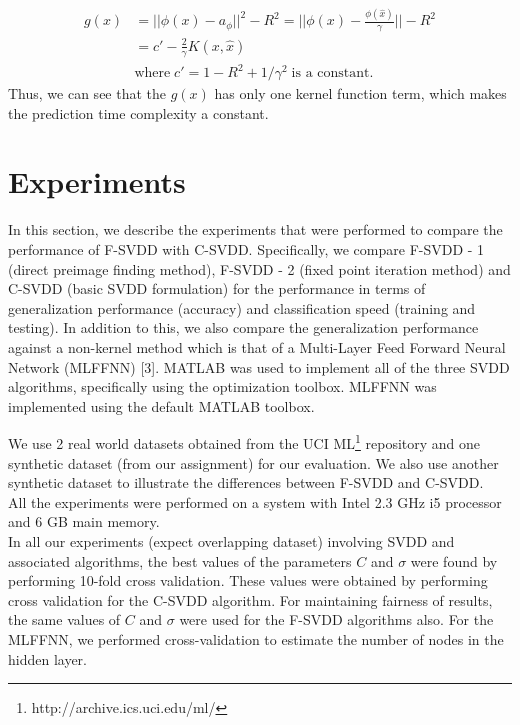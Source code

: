 \documentclass{article} %
\begin{document}
\begin{equation} \label{disc}
\begin{split}
g(x) &= || \phi(x) - a_\phi||^2 - R^2 = ||\phi(x) - \frac{\phi(\hat{x})}{\gamma} || - R^2 \\
 &=   c' - \frac{2}{\gamma} K(x,\hat{x}) \\ 
 & \text{where}\;  c' = 1- R^2 + 1/\gamma^2 \; \text{is a constant}.
\end{split}
\end{equation}
Thus, we can see that the $g(x)$ has only one kernel function term, which makes the prediction time complexity a constant. 

\section{Experiments}
In this section, we describe the experiments that were performed to compare the performance of F-SVDD with C-SVDD. Specifically, we compare F-SVDD - 1 (direct preimage finding method), F-SVDD - 2 (fixed point iteration method) and C-SVDD (basic SVDD formulation) for the performance in terms of generalization performance (accuracy) and classification speed (training and testing). In addition to this, we also compare the generalization performance against a non-kernel method which is that of a Multi-Layer Feed Forward Neural Network (MLFFNN) [3]. MATLAB was used to implement all of the three SVDD algorithms, specifically using the optimization toolbox. MLFFNN was implemented using the default MATLAB toolbox. 

We use 2 real world datasets obtained from the UCI ML\footnote{http://archive.ics.uci.edu/ml/} repository and one synthetic dataset (from our assignment) for our evaluation. We also use another synthetic dataset to illustrate the differences between F-SVDD and C-SVDD. \\[5pt]

All the experiments were performed on a system with Intel 2.3 GHz i5 processor and 6 GB main memory. \\[5pt]


In all our experiments (expect overlapping dataset) involving SVDD and associated algorithms, the best values of the parameters $C$ and $\sigma$ were found by performing 10-fold cross validation. These values were obtained by performing cross validation for the C-SVDD algorithm. For maintaining fairness of results, the same values of $C$ and $\sigma$ were used for the F-SVDD algorithms also. For the MLFFNN, we performed cross-validation to estimate the number of nodes in the hidden layer. \\[5pt]
\end{document}
